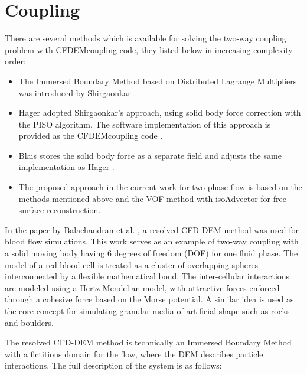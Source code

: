 \section{Coupling}
There are several methods which is available for solving the two-way coupling problem with CFDEMcoupling code, they listed below in increasing complexity order:
\begin{itemize}
\item The Immersed Boundary Method based on Distributed Lagrange Multipliers \cite{glowinski1999distributed} was introduced by Shirgaonkar \cite{shirgaonkar2009new}.
\item Hager \cite{hager2014cfd} adopted Shirgaonkar's approach, using solid body force correction with the PISO algorithm. The software implementation of this approach is provided as the CFDEMcoupling code \cite{kloss2012models}.
\item Blais \cite{blais2016semi} stores the solid body force as a separate field and adjusts the same implementation as Hager \cite{kloss2012models}.
\item The proposed approach in the current work for two-phase flow is based on the methods mentioned above and the VOF method with isoAdvector for free surface reconstruction.
\end{itemize}
In the paper by Balachandran et al. \cite{balachandran2021resolved}, a resolved CFD-DEM method was used for blood flow simulations. This work serves as an example of two-way coupling with a solid moving body having 6 degrees of freedom (DOF) for one fluid phase. The model of a red blood cell is treated as a cluster of overlapping spheres interconnected by a flexible mathematical bond. The inter-cellular interactions are modeled using a Hertz-Mendelian model, with attractive forces enforced through a cohesive force based on the Morse potential. A similar idea is used as the core concept for simulating granular media of artificial shape such as rocks and boulders.

The resolved CFD-DEM method is technically an Immersed Boundary Method with a fictitious domain for the flow, where the DEM describes particle interactions. The full description of the system is as follows:

